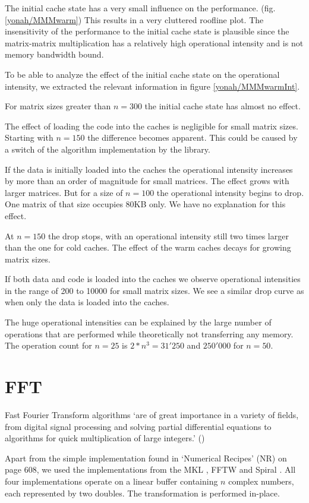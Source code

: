 \documentclass[a4paper,12pt]{report}
\begin{document}
The initial cache state has a very small influence on the performance. (fig.
\ref{yonah/MMMwarm}) This results in a very cluttered roofline plot. The
insensitivity of the performance to the initial cache state is plausible since
the matrix-matrix multiplication has a relatively high operational intensity
and is not memory bandwidth bound. 

To be able to analyze the effect of the initial cache state on the operational
intensity, we extracted the relevant information in figure
\ref{yonah/MMMwarmInt}.

For matrix sizes greater than $n=300$ the initial cache state has almost no
effect.

The effect of loading the code into the caches is negligible for small matrix
sizes. Starting with $n=150$ the difference becomes apparent. This could be
caused by a switch of the algorithm implementation by the library.

If the data is initially loaded into the caches the operational intensity
increases by more than an order of magnitude for small matrices. The effect
grows with larger matrices. But for a size of $n=100$ the operational
intensity begins to drop. One matrix of that size occupies 80KB only. We have
no explanation for this effect. 

At $n=150$ the drop stops, with an operational intensity still two times larger
than the one for cold caches. The effect of the warm caches decays for growing
matrix sizes. 

If both data and code is loaded into the caches we observe operational
intensities in the range of 200 to 10000 for small matrix sizes. We see a
similar drop curve as when only the data is loaded into the caches. 

The huge operational intensities can be explained by the large number of
operations that are performed while theoretically not transferring any memory.
The operation count for $n=25$ is $2*n^3=31'250$ and $250'000$ for $n=50$.
 
\section{FFT}
Fast Fourier Transform algorithms `are of great importance in a variety of
fields, from digital signal processing and solving partial differential
equations to algorithms for quick multiplication of large integers.'
(\cite{FastFourierTransform})

Apart from the simple implementation found in `Numerical Recipes' (NR)
\cite{Press:2007:NRE:1403886} on page 608, we used the implementations from the MKL \cite{MKL} , FFTW \cite{FFTW}
and Spiral \cite{Spiral}. All four implementations operate on a linear buffer
containing $n$ complex numbers, each represented by two doubles. The
transformation is performed in-place.
\end{document}

